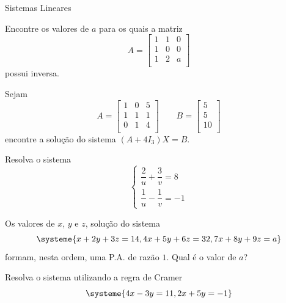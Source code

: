 \begin{exercicios}{Sistemas Lineares}
    \begin{exercicio}
        Encontre os valores de $a$ para os quais a matriz
        \[A = \left[ 
        \begin{array}{rrr}
            1 & 1 & 0 \\
            1 & 0 & 0 \\
            1 & 2 & a \\
        \end{array}
        \right]\]
        possui inversa.
    \end{exercicio}
    
    \begin{exercicio}
        Sejam
        \[A = \left[ 
            \begin{array}{rrr}
                1 & 0 & 5 \\
                1 & 1 & 1 \\
                0 & 1 & 4 \\
            \end{array}
            \right] 
            \qquad  
        B = \left[ \begin{array}{c} 5 \\ 5 \\ 10 \\ \end{array} \right] 
        \]
        encontre a solução do sistema $(A+4I_3)X=B$.
    \end{exercicio}
    
    \begin{exercicio}
        Resolva o sistema
        \[\begin{cases}
        	\dfrac{2}{u} + \dfrac{3}{v} =  8 \\[4mm]
        	\dfrac{1}{u} - \dfrac{1}{v} = -1
        \end{cases}\]
    \end{exercicio}
    
    \begin{exercicio}
        Os valores de $x$, $y$ e $z$, solução do sistema
        \[\systeme{
        	x + 2y + 3z  = 14,
        	4x + 5y + 6z = 32,
        	7x + 8y + 9z = a}
        \]
        formam, nesta ordem, uma P.A. de razão $1$. Qual é o valor de $a$?	
    \end{exercicio}
    
    \begin{exercicio}
        Resolva o sistema utilizando a regra de Cramer
        \[\systeme{
            4x - 3y = 11,
            2x + 5y = -1}
        \]
    \end{exercicio}
    

\end{exercicios}
